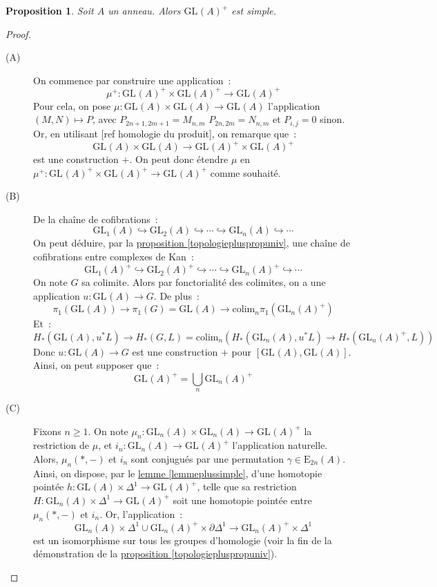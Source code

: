 \documentclass{amsart}
\newcommand{\sref}[2]{\hyperref[#2]{#1 \ref*{#2}}}
\theoremstyle{plain}
\newtheorem{prop}[theo]{Proposition}
\theoremstyle{definition}
\theoremstyle{remark}
\newcommand{\colim}{\mathrm{colim}}
\newcommand{\GL}[2]{\mathrm{GL}_{#1}(#2)}
\newcommand{\EGL}[2]{\mathrm{E}_{#1}(#2)}
\newcommand{\ra}{\rightarrow}
\begin{document}
\begin{prop}\label{GLAplussimple}
  Soit $A$ un anneau. Alors $\GL{}{A}^+$ est simple.
\end{prop}

\begin{proof}
  \begin{description}
    \item[(A)] On commence par construire une application~:
    $$\mu^+: \GL{}{A}^+\times\GL{}{A}^+\ra\GL{}{A}^+$$
    Pour cela,
    on pose $\mu:\GL{}{A}\times\GL{}{A}\ra \GL{}{A}$ l'application $(M,N)\mapsto P$, avec $P_{2n+1,2m+1}=M_{n,m}$
    $P_{2n,2m}=N_{n,m}$ et $P_{i,j}=0$ sinon. Or, en utilisant [ref homologie du produit], on remarque que~:
    $$\GL{}{A}\times \GL{}{A}\ra \GL{}{A}^+\times\GL{}{A}^+$$
    est une construction $+$. On peut donc étendre $\mu$ en $\mu^+:\GL{}{A}^+\times\GL{}{A}^+\ra\GL{}{A}^+$ comme souhaité.
    \item[(B)] De la chaîne de cofibrations~:
    $$\GL{1}{A}\hookrightarrow \GL{2}{A}\hookrightarrow\dotsb\hookrightarrow\GL{n}{A}\hookrightarrow\dotsb$$
    On peut déduire, par la \sref{proposition}{topologiepluspropuniv}, une chaîne de cofibrations entre complexes de Kan~:
    $$\GL{1}{A}^+\hookrightarrow \GL{2}{A}^+\hookrightarrow\dotsb\hookrightarrow\GL{n}{A}^+\hookrightarrow\dotsb$$
    On note $G$ sa colimite. Alors par fonctorialité des colimites, on a une application $u:\GL{}{A}\ra G$.
    De plus~:
    $$\pi_1(\GL{}{A})\ra \pi_1(G)=\GL{}{A}\ra\colim_{n}\pi_1(\GL{n}{A}^+)$$
    Et~:
    $$H_*(\GL{}{A},u^*L)\ra H_*(G,L)=\colim_{n}(H_*(\GL{n}{A},u^*L)\ra H_*(\GL{n}{A}^+,L))$$
    Donc $u:\GL{}{A}\ra G$ est une construction $+$ pour $[\GL{}{A},\GL{}{A}]$. Ainsi, on peut supposer que~:
    $$\GL{}{A}^+ =\bigcup_n\GL{n}{A}^+$$
    \item[(C)] Fixons $n\geq 1$. On note $\mu_n:\GL{n}{A}\times\GL{n}{A}\ra\GL{}{A}^+$ la restriction de $\mu$,
    et $i_n:\GL{n}{A}\ra\GL{}{A}^+$ l'application naturelle. Alors, $\mu_n(*,-)$ et $i_n$ sont conjugués par une permutation $\gamma\in \EGL{2n}{A}$.
    Ainsi, on dispose, par le \sref{lemme}{lemmeplussimple}, d'une homotopie pointée $h:\GL{}{A}\times\Delta^1\ra \GL{}{A}^+$,
    telle que sa restriction $H:\GL{n}{A}\times\Delta^1\ra \GL{}{A}^+$ soit une homotopie pointée entre $\mu_n(*,-)$ et $i_n$. Or, l'application~:
    $$\GL{n}{A}\times\Delta^1\cup\GL{n}{A}^+\times\partial\Delta^1\ra\GL{n}{A}^+\times\Delta^1$$
    est un isomorphisme sur tous les groupes d'homologie (voir la fin de la démonstration de la \sref{proposition}{topologiepluspropuniv}).

\end{description}
\end{proof}
\end{document}
